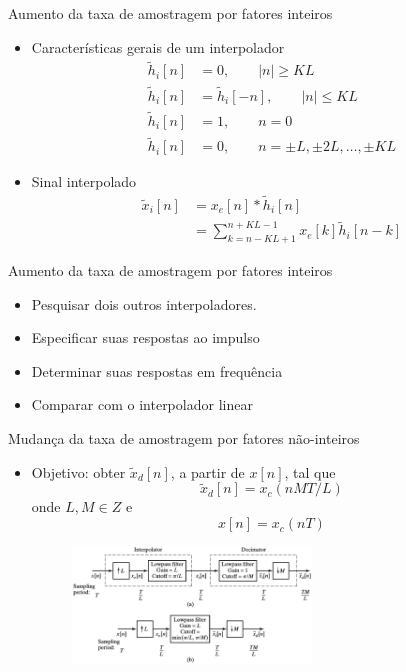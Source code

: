 \begin{slide}{Aumento da taxa de amostragem por fatores inteiros}
	\begin{itemize}
		\item Características gerais de um interpolador
			\begin{align*}
				\tilde h_i[n]&= 0, \qquad |n|\geq KL\\
				\tilde h_i[n]&= \tilde h_i[-n], \qquad |n|\leq KL\\
				\tilde h_i[n]&= 1, \qquad n=0\\
				\tilde h_i[n]&= 0, \qquad n=\pm L, \pm 2L,\dots, \pm KL
			\end{align*}
		\item Sinal interpolado
			\begin{align*}
				\tilde x_i[n] &= x_e[n] * \tilde h_i[n]\\
				              &= \sum_{k= n-KL+1}^{n+KL-1} x_e[k]\tilde h_i[n-k]
			\end{align*}
	\end{itemize}
\end{slide}
\begin{slide}{Aumento da taxa de amostragem por fatores inteiros}
	\begin{itemize}
		\item Pesquisar dois outros interpoladores.
		\item Especificar suas respostas ao impulso
		\item Determinar suas respostas em frequência
		\item Comparar com o interpolador linear
	\end{itemize}
\end{slide}

\begin{slide}{Mudança da taxa de amostragem por fatores não-inteiros}
	\begin{itemize}
		\item Objetivo: obter $\tilde x_d[n]$, a partir de $x[n]$, tal que 
			\begin{equation*}
				\tilde x_d[n] = x_c(nMT/L)
			\end{equation*}
			onde $L, M \in Z$ e 
			\begin{equation*}
				x[n] = x_c(nT)
			\end{equation*}
			\begin{figure}
				\centering
				\includegraphics[width=0.6\textwidth]{figs/4-29.eps}
		        \end{figure}
	\end{itemize}
\end{slide}

